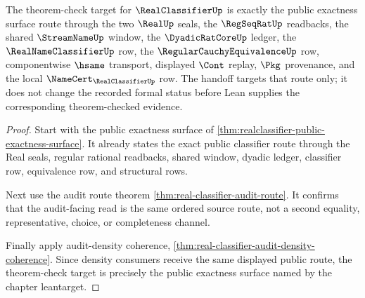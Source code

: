 \begin{theorem}
\label{thm:real-classifier-theoremcheck-target-handoff}
The theorem-check target for $\RealClassifierUp$ is exactly the public exactness surface route through the two $\RealUp$ seals, the $\RegSeqRatUp$ readbacks, the shared $\StreamNameUp$ window, the $\DyadicRatCoreUp$ ledger, the $\RealNameClassifierUp$ row, the $\RegularCauchyEquivalenceUp$ row, componentwise $\hsame$ transport, displayed $\Cont$ replay, $\Pkg$ provenance, and the local $\NameCert_{\RealClassifierUp}$ row. The handoff targets that route only; it does not change the recorded formal status before Lean supplies the corresponding theorem-checked evidence.
\end{theorem}
\begin{proof}
Start with the public exactness surface of \autoref{thm:realclassifier-public-exactness-surface}. It already states the exact public classifier route through the Real seals, regular rational readbacks, shared window, dyadic ledger, classifier row, equivalence row, and structural rows.

Next use the audit route theorem \autoref{thm:real-classifier-audit-route}. It confirms that the audit-facing read is the same ordered source route, not a second equality, representative, choice, or completeness channel.

Finally apply audit-density coherence, \autoref{thm:real-classifier-audit-density-coherence}. Since density consumers receive the same displayed public route, the theorem-check target is precisely the public exactness surface named by the chapter leantarget.
\end{proof}


